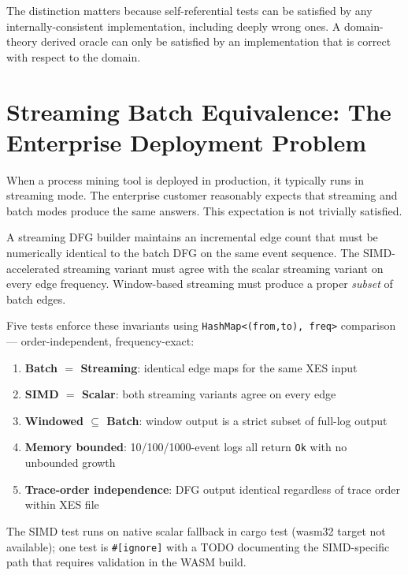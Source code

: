 \documentclass[12pt,a4paper]{article}
\begin{document}
The distinction matters because self-referential tests can be satisfied by any
internally-consistent implementation, including deeply wrong ones. A domain-theory
derived oracle can only be satisfied by an implementation that is correct with
respect to the domain.

\section{Streaming Batch Equivalence: The Enterprise Deployment Problem}
\label{sec:streaming}

When a process mining tool is deployed in production, it typically runs in
streaming mode. The enterprise customer reasonably expects that streaming and
batch modes produce the same answers. This expectation is not trivially satisfied.

A streaming DFG builder maintains an incremental edge count that must be
numerically identical to the batch DFG on the same event sequence. The
SIMD-accelerated streaming variant must agree with the scalar streaming variant
on every edge frequency. Window-based streaming must produce a proper \emph{subset}
of batch edges.

Five tests enforce these invariants using \texttt{HashMap\textless(from,to), freq\textgreater}
comparison --- order-independent, frequency-exact:

\begin{enumerate}
  \item \textbf{Batch $=$ Streaming}: identical edge maps for the same XES input
  \item \textbf{SIMD $=$ Scalar}: both streaming variants agree on every edge
  \item \textbf{Windowed $\subseteq$ Batch}: window output is a strict subset of full-log output
  \item \textbf{Memory bounded}: 10/100/1000-event logs all return \texttt{Ok}
    with no unbounded growth
  \item \textbf{Trace-order independence}: DFG output identical regardless of
    trace order within XES file
\end{enumerate}

The SIMD test runs on native scalar fallback in cargo test (wasm32 target not
available); one test is \texttt{\#[ignore]} with a TODO documenting the SIMD-specific
path that requires validation in the WASM build.

\end{document}
